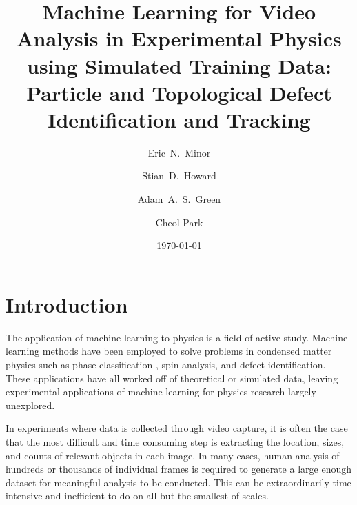 \documentclass[prl,reprint,showpacs,floatfix,nofootinbib]{revtex4-1}
\begin{document}
\title{Machine Learning for Video Analysis in Experimental Physics using Simulated Training Data: Particle and Topological Defect Identification and Tracking}
\date{\today}
\author{Eric~N.~Minor}
\author{Stian~D.~Howard}
\author{Adam~A.~S.~Green}
\author{Cheol Park}

\begin{abstract}
    \blindtext{}
\end{abstract}

\maketitle

\section{Introduction}

The application of machine learning to physics is a field of active study. Machine learning methods have been employed to solve problems in condensed matter physics such as phase classification \cite{deng_machine_2017}\cite{carrasquilla_machine_2017}\cite{beach_machine_2018}, spin analysis\cite{wang_machine_2017}, and defect identification\cite{walters_machine_2019}. These applications have all worked off of theoretical or simulated data, leaving experimental applications of machine learning for physics research largely unexplored. 

In experiments where data is collected through video capture, it is often the case that the most difficult and time consuming step is extracting the location, sizes, and counts of relevant objects in each image. In many cases, human analysis of hundreds or thousands of individual frames is required to generate a large enough dataset for meaningful analysis to be conducted. This can be extraordinarily time intensive and inefficient to do on all but the smallest of scales. %
\end{document}
